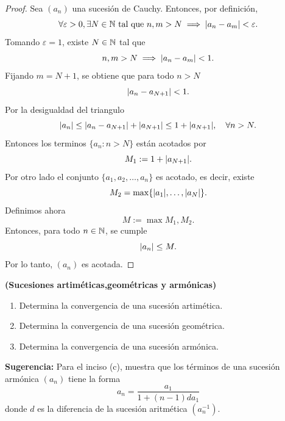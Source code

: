 \documentclass[12pt,a4paper]{article}
\begin{document}
    \begin{proof}
        Sea $(a_{n})$ una sucesión de Cauchy. Entonces, por definición,
        \begin{equation*}
            \forall\varepsilon>0,\exists N\in\mathbb{N}\text{ tal que }n,m> N\implies\abs{a_{n}-a_{m}}<\varepsilon.
        \end{equation*}
        Tomando $\varepsilon=1$, existe $N\in\mathbb{N}$ tal que
        \begin{equation*}
            n,m> N\implies\abs{a_{n}-a_{m}}<1.
        \end{equation*}
        Fijando $m=N+1$, se obtiene que para todo $n\gt N$
        \begin{equation*}
            \abs{a_{n}-a_{N+1}}<1.
        \end{equation*}
        Por la desigualdad del triangulo
        \begin{equation*}
            \abs{a_{n}}\leq\abs{a_{n}-a_{N+1}}+\abs{a_{N+1}}\leq1+\abs{a_{N+1}},\quad\forall n> N.
        \end{equation*}
        Entonces los terminos $\{a_{n}:n\gt N\}$ están acotados por
        \begin{equation*}
            M_{1}:=1+\abs{a_{N+1}}.
        \end{equation*}
        Por otro lado el conjunto $\{a_{1},a_{2},\dots,a_{n}\}$ es acotado, es decir, existe
        \begin{equation*}
            M_{2}=\max\{\abs{a_{1}},\dots,\abs{a_{N}}\}.
        \end{equation*}
        Definimos ahora
        \begin{equation*}
            M:=\max{M_{1},M_{2}}.
        \end{equation*}
        Entonces, para todo $n\in\mathbb{N}$, se cumple
        \begin{equation*}
            \abs{a_{n}}\leq M.
        \end{equation*}
        Por lo tanto, $(a_{n})$ es acotada.
    \end{proof}

    \begin{mdframed}[style=mdbluebox,frametitle={Ejercicio 6}]
        \textbf{(Sucesiones artiméticas,geométricas y armónicas)}
        \begin{enumerate}
            \item[(a)] Determina la convergencia de una sucesión artimética.
            \item[(b)] Determina la convergencia de una sucesión geométrica.
            \item[(c)] Determina la convergencia de una sucesión armónica. 
        \end{enumerate}
        \textbf{Sugerencia:} Para el inciso (c), muestra que los términos de una sucesión armónica $(a_{n})$ tiene la forma
        \begin{equation*}
            a_{n}=\frac{a_{1}}{1+(n-1)da_{1}}
        \end{equation*}
        donde $d$ es la diferencia de la sucesión aritmética $(a_{n}^{-1})$.
    \end{mdframed}
\end{document}
